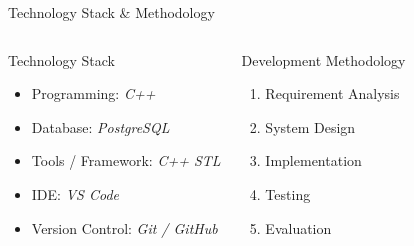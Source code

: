 \documentclass[aspectratio=169,11pt]{beamer}
\newcommand{\placeholder}[1]{\textit{\color{GEUGrey}#1}}
\begin{document}
\begin{frame}{Technology Stack \& Methodology}
\begin{columns}[T,totalwidth=\textwidth]
\begin{block}{Technology Stack}
\begin{itemize}\itemsep2pt
\item Programming: \placeholder{C++}
\item Database: \placeholder{PostgreSQL}
\item Tools / Framework: \placeholder{C++ STL}
\item IDE: \placeholder{VS Code}
\item Version Control: \placeholder{Git / GitHub}
\end{itemize}
\end{block}
\begin{block}{Development Methodology}
\begin{enumerate}\itemsep2pt
\item Requirement Analysis
\item System Design
\item Implementation
\item Testing
\item Evaluation
\end{enumerate}
\end{block}
\end{columns}
\vfill
\begin{center}
\end{center}
\end{frame}
\end{document}
